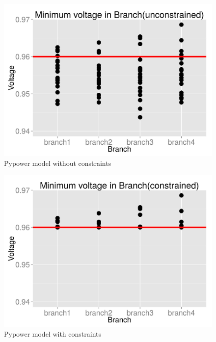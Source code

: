 \documentclass[a4paper]{article}
\begin{document}
\begin{figure}[!ht]
\includegraphics[width =\textwidth]{unconstrained.jpg}
\caption{Pypower model without constraints}
\label{un_constrained_pypower}
\end{figure}

\begin{figure}[!ht]
\includegraphics[width =\textwidth]{constrained.jpg}
\caption{Pypower model with constraints}
\label{constrained_pypower}
\end{figure}
\newpage
\end{document}
